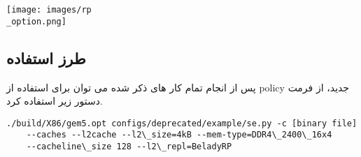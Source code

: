 \texttt{[image: images/rp\\\_option.png]}

\subsection*{طرز استفاده}

پس از انجام تمام کار های ذکر شده می توان برای استفاده از 
policy
جدید، از فرمت دستور زیر استفاده کرد.

\begin{latin}
\begin{lstlisting}[language=linux, caption=cloning gem5]
    ./build/X86/gem5.opt configs/deprecated/example/se.py -c [binary file]
    --caches --l2cache --l2\_size=4kB --mem-type=DDR4\_2400\_16x4
    --cacheline\_size 128 --l2\_repl=BeladyRP
\end{lstlisting}
\end{latin}